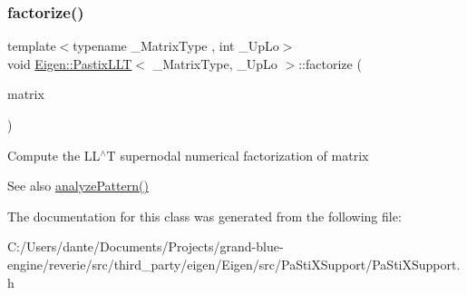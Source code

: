 \subsubsection{\texorpdfstring{factorize()}{factorize()}}
{\footnotesize\ttfamily template$<$typename \+\_\+\+Matrix\+Type , int \+\_\+\+Up\+Lo$>$ \\
void \mbox{\hyperlink{class_eigen_1_1_pastix_l_l_t}{Eigen\+::\+Pastix\+L\+LT}}$<$ \+\_\+\+Matrix\+Type, \+\_\+\+Up\+Lo $>$\+::factorize (\begin{DoxyParamCaption}\item[{const Matrix\+Type \&}]{matrix }\end{DoxyParamCaption})\hspace{0.3cm}{\ttfamily [inline]}}

Compute the L\+L$^\wedge$T supernodal numerical factorization of {\ttfamily matrix} \begin{DoxySeeAlso}{See also}
\mbox{\hyperlink{class_eigen_1_1_pastix_l_l_t_a671e8444ae2f04db3565e35caa958667}{analyze\+Pattern()}} 
\end{DoxySeeAlso}


The documentation for this class was generated from the following file\+:\begin{DoxyCompactItemize}
\item 
C\+:/\+Users/dante/\+Documents/\+Projects/grand-\/blue-\/engine/reverie/src/third\+\_\+party/eigen/\+Eigen/src/\+Pa\+Sti\+X\+Support/Pa\+Sti\+X\+Support.\+h\end{DoxyCompactItemize}
